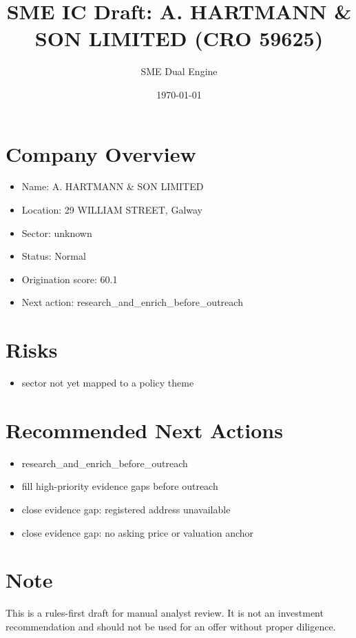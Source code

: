 \documentclass[11pt,a4paper]{article}
\title{SME IC Draft: A. HARTMANN \& SON LIMITED (CRO 59625)}
\author{SME Dual Engine}
\date{\today}
\begin{document}
\maketitle
\section*{Company Overview}
\begin{itemize}[leftmargin=1.4em]
\item Name: A. HARTMANN \& SON LIMITED
\item Location: 29 WILLIAM STREET, Galway
\item Sector: unknown
\item Status: Normal
\item Origination score: 60.1
\item Next action: research\_and\_enrich\_before\_outreach
\end{itemize}
\section*{Risks}
\begin{itemize}[leftmargin=1.4em]
\item sector not yet mapped to a policy theme
\end{itemize}
\section*{Recommended Next Actions}
\begin{itemize}[leftmargin=1.4em]
\item research\_and\_enrich\_before\_outreach
\item fill high-priority evidence gaps before outreach
\item close evidence gap: registered address unavailable
\item close evidence gap: no asking price or valuation anchor
\end{itemize}
\section*{Note}
This is a rules-first draft for manual analyst review. It is not an investment
recommendation and should not be used for an offer without proper diligence.
\end{document}
